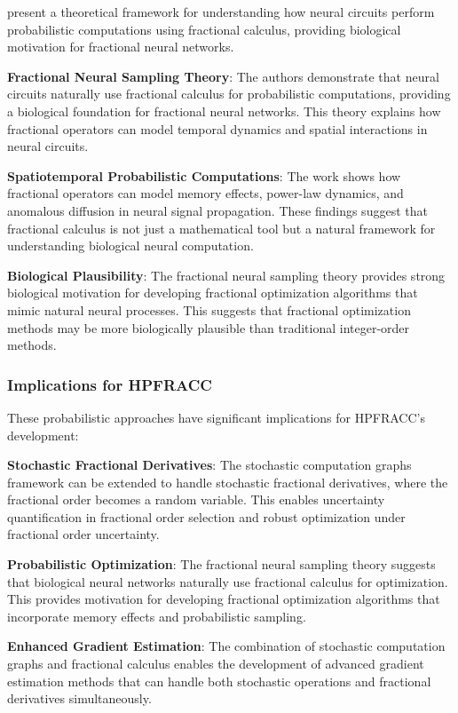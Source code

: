 \citet{qi2022fractional} present a theoretical framework for understanding how neural circuits perform probabilistic computations using fractional calculus, providing biological motivation for fractional neural networks.

\textbf{Fractional Neural Sampling Theory}: The authors demonstrate that neural circuits naturally use fractional calculus for probabilistic computations, providing a biological foundation for fractional neural networks. This theory explains how fractional operators can model temporal dynamics and spatial interactions in neural circuits.

\textbf{Spatiotemporal Probabilistic Computations}: The work shows how fractional operators can model memory effects, power-law dynamics, and anomalous diffusion in neural signal propagation. These findings suggest that fractional calculus is not just a mathematical tool but a natural framework for understanding biological neural computation.

\textbf{Biological Plausibility}: The fractional neural sampling theory provides strong biological motivation for developing fractional optimization algorithms that mimic natural neural processes. This suggests that fractional optimization methods may be more biologically plausible than traditional integer-order methods.

\subsubsection{Implications for HPFRACC}

These probabilistic approaches have significant implications for HPFRACC's development:

\textbf{Stochastic Fractional Derivatives}: The stochastic computation graphs framework can be extended to handle stochastic fractional derivatives, where the fractional order becomes a random variable. This enables uncertainty quantification in fractional order selection and robust optimization under fractional order uncertainty.

\textbf{Probabilistic Optimization}: The fractional neural sampling theory suggests that biological neural networks naturally use fractional calculus for optimization. This provides motivation for developing fractional optimization algorithms that incorporate memory effects and probabilistic sampling.

\textbf{Enhanced Gradient Estimation}: The combination of stochastic computation graphs and fractional calculus enables the development of advanced gradient estimation methods that can handle both stochastic operations and fractional derivatives simultaneously.

